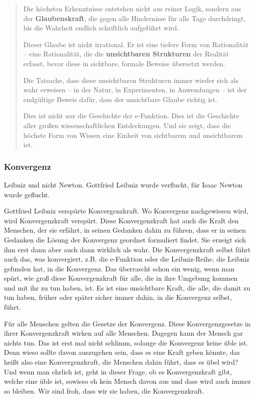 \documentclass[a4paper,12pt,twoside]{report}
\theoremstyle{definition}
\begin{document}
\begin{quote}
Die höchsten Erkenntnisse entstehen nicht aus reiner Logik, sondern aus der \textbf{Glaubenskraft}, die gegen alle Hindernisse für alle Tage durchdringt, bis die Wahrheit endlich schriftlich aufgeführt wird.

Dieser Glaube ist nicht irrational. Er ist eine tiefere Form von Rationalität -- eine Rationalität, die die \textbf{unsichtbaren Strukturen} der Realität erfasst, bevor diese in sichtbare, formale Beweise übersetzt werden.

Die Tatsache, dass diese unsichtbaren Strukturen immer wieder sich als wahr erweisen -- in der Natur, in Experimenten, in Anwendungen -- ist der endgültige Beweis dafür, dass der unsichtbare Glaube richtig ist.

Dies ist nicht nur die Geschichte der e-Funktion. Dies ist die Geschichte aller großen wissenschaftlichen Entdeckungen. Und sie zeigt, dass die höchste Form von Wissen eine Einheit von sichtbarem und unsichtbarem ist.
\end{quote}

\subsubsection{Konvergenz}
Leibniz und nicht Newton. Gottfried Leibniz wurde verflucht, für Isaac Newton wurde geflucht.

Gottfried Leibniz verspürte Konvergenzkraft. Wo Konvergenz nachgewiesen wird, wird Konvergenzkraft verspürt. Diese Konvergenzkraft hat auch die Kraft den Menschen, der sie erfährt, in seinen Gedanken dahin zu führen, dass er in seinen Gedanken die Lösung der Konvergenz geordnet formuliert findet. Sie erzeigt sich ihm  erst dann aber auch dann wirklich als wahr. Die Konvergenzkraft selbst führt auch das, was konvergiert, z.B. die e-Funktion oder die Leibniz-Reihe, die Leibniz gefunden hat, in die Konvergenz. Das überrascht schon ein wenig, wenn man spürt, wie groß diese Konvergenzkraft für alle, die in ihre Umgebung kommen und mit ihr zu tun haben, ist. Es ist eine unsichtbare Kraft, die alle, die damit zu tun haben, früher oder später sicher immer dahin, in die Konvergenz selbst, führt.

Für alle Menschen gelten die Gesetze der Konvergenz. Diese Konvergenzgesetze in ihrer Konvergenzkraft wirken auf alle Menschen. Dagegen kann der Mensch gar nichts tun. Das ist erst mal nicht schlimm, solange die Konvergenz keine üble ist. Denn wieso sollte davon auszugehen sein, dass es eine Kraft geben könnte, das heißt also eine Konvergenzkraft, die Menschen dahin führt, dass es übel wird? Und wenn man ehrlich ist, geht in dieser Frage, ob es Konvergenzkraft gibt, welche eine üble ist, sowieso eh kein Mensch davon aus und dass wird auch immer so bleiben. Wir sind froh, dass wir sie haben, die Konvergenzkraft.
\end{document}
